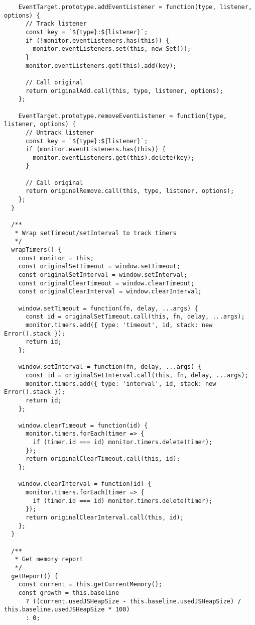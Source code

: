 \documentclass[11pt]{article}
\begin{document}
\begin{verbatim}
    EventTarget.prototype.addEventListener = function(type, listener, options) {
      // Track listener
      const key = `${type}:${listener}`;
      if (!monitor.eventListeners.has(this)) {
        monitor.eventListeners.set(this, new Set());
      }
      monitor.eventListeners.get(this).add(key);
      
      // Call original
      return originalAdd.call(this, type, listener, options);
    };
    
    EventTarget.prototype.removeEventListener = function(type, listener, options) {
      // Untrack listener
      const key = `${type}:${listener}`;
      if (monitor.eventListeners.has(this)) {
        monitor.eventListeners.get(this).delete(key);
      }
      
      // Call original
      return originalRemove.call(this, type, listener, options);
    };
  }
  
  /**
   * Wrap setTimeout/setInterval to track timers
   */
  wrapTimers() {
    const monitor = this;
    const originalSetTimeout = window.setTimeout;
    const originalSetInterval = window.setInterval;
    const originalClearTimeout = window.clearTimeout;
    const originalClearInterval = window.clearInterval;
    
    window.setTimeout = function(fn, delay, ...args) {
      const id = originalSetTimeout.call(this, fn, delay, ...args);
      monitor.timers.add({ type: 'timeout', id, stack: new Error().stack });
      return id;
    };
    
    window.setInterval = function(fn, delay, ...args) {
      const id = originalSetInterval.call(this, fn, delay, ...args);
      monitor.timers.add({ type: 'interval', id, stack: new Error().stack });
      return id;
    };
    
    window.clearTimeout = function(id) {
      monitor.timers.forEach(timer => {
        if (timer.id === id) monitor.timers.delete(timer);
      });
      return originalClearTimeout.call(this, id);
    };
    
    window.clearInterval = function(id) {
      monitor.timers.forEach(timer => {
        if (timer.id === id) monitor.timers.delete(timer);
      });
      return originalClearInterval.call(this, id);
    };
  }
  
  /**
   * Get memory report
   */
  getReport() {
    const current = this.getCurrentMemory();
    const growth = this.baseline 
      ? ((current.usedJSHeapSize - this.baseline.usedJSHeapSize) / this.baseline.usedJSHeapSize * 100)
      : 0;
    

\end{verbatim}
\end{document}
